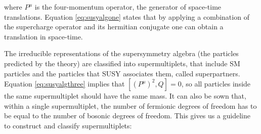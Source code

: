 
where $P^\mu$ is the four-momentum operator, the generator of space-time translations. Equation \ref{eq:susyalgone} states that by applying a combination of the supercharge operator and its hermitian conjugate one can obtain a translation in space-time.


The irreducible representations of the supersymmetry algebra (the particles predicted by the theory) are classified into supermultiplets, that include SM particles and the particles that SUSY associates them, called superpartners. Equation \ref{eq:susyalgthree} implies that $[ (P^\mu)^2 , Q  ]=0$, so all particles inside the same supermultiplet should have the same mass. It can also be sown that, within a single supermultiplet, the number of fermionic degrees of freedom has to be equal to the number of bosonic degrees of freedom. This gives us a guideline to construct and classify supermultiplets:

